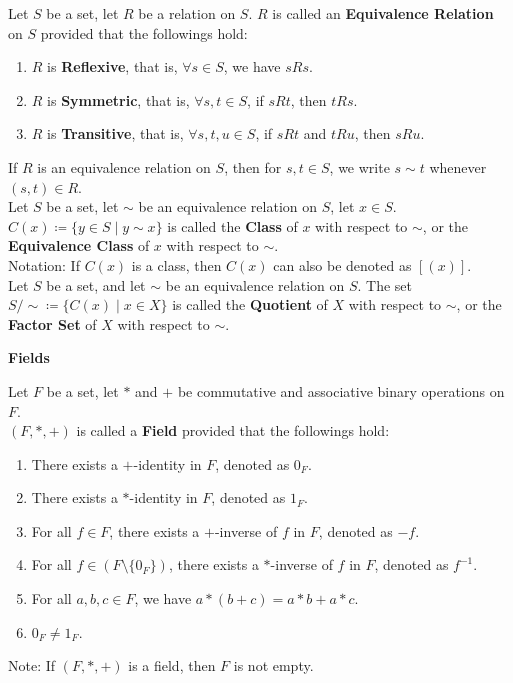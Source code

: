 \documentclass[11pt]{article}
\newcommand{\note}{\color{gray}Note: \color{black}}
\newcommand{\notation}{\color{gray}Notation: \color{black}}
\begin{document}
		\noindent Let $S$ be a set, let $R$ be a relation on $S$. $R$ is called an \textbf{Equivalence Relation} on $S$ provided that the followings hold:
		\begin{enumerate}[topsep=3pt,itemsep=-1ex,partopsep=1ex,parsep=1ex]
			\item $R$ is \textbf{Reflexive}, that is, $\forall s \in S$, we have $sRs$.
			\item $R$ is \textbf{Symmetric}, that is, $\forall s,t \in S$, if $sRt$, then $tRs$.
			\item $R$ is \textbf{Transitive}, that is, $\forall s,t,u \in S$, if $sRt$ and $tRu$, then $sRu$.
		\end{enumerate}
		If $R$ is an equivalence relation on $S$, then for $s,t \in S$, we write $s \sim t$ whenever $(s,t) \in R$.\\
		
		\noindent Let $S$ be a set, let $\sim$ be an equivalence relation on $S$, let $x \in S$. $C(x)\coloneqq \{ y \in S \mid y \sim x \}$ is called the \textbf{Class} of $x$ with respect to $\sim$, or the \textbf{Equivalence Class} of $x$ with respect to $\sim$.\\
		\notation If $C(x)$ is a class, then $C(x)$ can also be denoted as $[(x)]$.\\

		\noindent Let $S$ be a set, and let $\sim$ be an equivalence relation on $S$. The set $S/{\sim} \coloneqq \{ C(x) \mid x \in X\}$ is called the \textbf{Quotient} of $X$ with respect to $\sim$, or the \textbf{Factor Set} of $X$ with respect to $\sim$.\\
		
	\clearpage






	\LARGE \color{red}
		\noindent \textbf{Fields}\\
	\normalsize \color{black}
	
		\noindent Let $F$ be a set, let $\ast$ and $+$ be commutative and associative binary operations on $F$.\\ $(F,\ast,+)$ is called a \textbf{Field} provided that the followings hold:
		\begin{enumerate}[topsep=3pt,itemsep=-1ex,partopsep=1ex,parsep=1ex]
			\item There exists a $+$-identity in $F$, denoted as $0_F$.
			\item There exists a $\ast$-identity in $F$, denoted as $1_F$.
			\item For all $f \in F$, there exists a $+$-inverse of $f$ in $F$, denoted as $-f$.
			\item For all $f \in (F \setminus \{0_F\})$, there exists a $\ast$-inverse of $f$ in $F$, denoted as $f^{-1}$.		
			\item For all $a,b,c \in F$, we have $a \ast (b+c)=a\ast b+a\ast c$.
			\item $0_F \neq 1_F$.
		\end{enumerate}
		\note If $(F,\ast,+)$ is a field, then $F$ is not empty.\\
	
\end{document}

